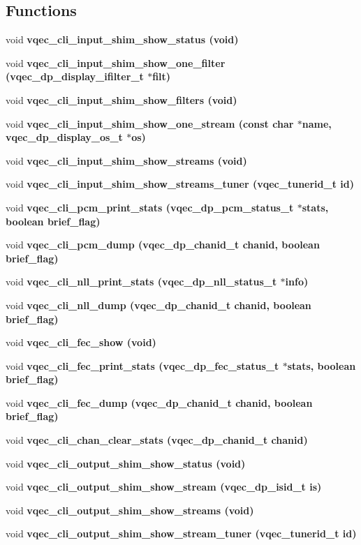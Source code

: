 \subsection*{Functions}
\begin{CompactItemize}
\item 
void \bf{vqec\_\-cli\_\-input\_\-shim\_\-show\_\-status} (void)
\item 
void \bf{vqec\_\-cli\_\-input\_\-shim\_\-show\_\-one\_\-filter} (vqec\_\-dp\_\-display\_\-ifilter\_\-t $\ast$filt)
\item 
void \bf{vqec\_\-cli\_\-input\_\-shim\_\-show\_\-filters} (void)
\item 
void \bf{vqec\_\-cli\_\-input\_\-shim\_\-show\_\-one\_\-stream} (const char $\ast$name, vqec\_\-dp\_\-display\_\-os\_\-t $\ast$os)
\item 
void \bf{vqec\_\-cli\_\-input\_\-shim\_\-show\_\-streams} (void)
\item 
void \bf{vqec\_\-cli\_\-input\_\-shim\_\-show\_\-streams\_\-tuner} (vqec\_\-tunerid\_\-t id)
\item 
void \bf{vqec\_\-cli\_\-pcm\_\-print\_\-stats} (vqec\_\-dp\_\-pcm\_\-status\_\-t $\ast$stats, boolean brief\_\-flag)
\item 
void \bf{vqec\_\-cli\_\-pcm\_\-dump} (vqec\_\-dp\_\-chanid\_\-t chanid, boolean brief\_\-flag)
\item 
void \bf{vqec\_\-cli\_\-nll\_\-print\_\-stats} (vqec\_\-dp\_\-nll\_\-status\_\-t $\ast$info)
\item 
void \bf{vqec\_\-cli\_\-nll\_\-dump} (vqec\_\-dp\_\-chanid\_\-t chanid, boolean brief\_\-flag)
\item 
void \bf{vqec\_\-cli\_\-fec\_\-show} (void)
\item 
void \bf{vqec\_\-cli\_\-fec\_\-print\_\-stats} (vqec\_\-dp\_\-fec\_\-status\_\-t $\ast$stats, boolean brief\_\-flag)
\item 
void \bf{vqec\_\-cli\_\-fec\_\-dump} (vqec\_\-dp\_\-chanid\_\-t chanid, boolean brief\_\-flag)
\item 
void \bf{vqec\_\-cli\_\-chan\_\-clear\_\-stats} (vqec\_\-dp\_\-chanid\_\-t chanid)
\item 
void \bf{vqec\_\-cli\_\-output\_\-shim\_\-show\_\-status} (void)
\item 
void \bf{vqec\_\-cli\_\-output\_\-shim\_\-show\_\-stream} (vqec\_\-dp\_\-isid\_\-t is)
\item 
void \bf{vqec\_\-cli\_\-output\_\-shim\_\-show\_\-streams} (void)
\item 
void \bf{vqec\_\-cli\_\-output\_\-shim\_\-show\_\-stream\_\-tuner} (vqec\_\-tunerid\_\-t id)

\end{CompactItemize}

